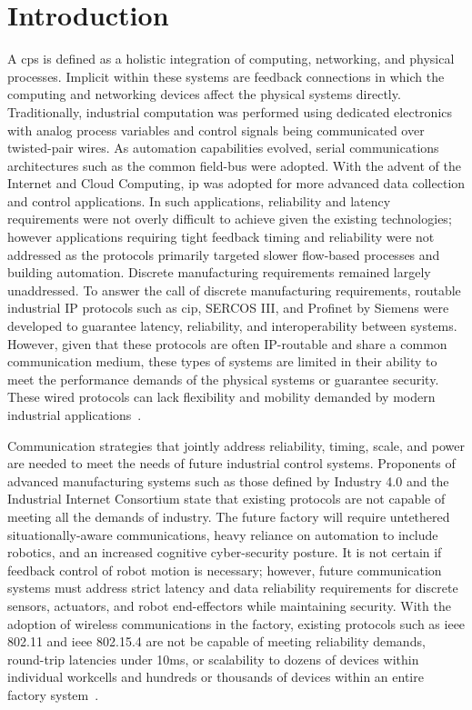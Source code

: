 \chapter{Introduction}\label{chapter:intro}

\chapterintro*

A \Gls{cps} is defined as a holistic integration of computing, networking, and physical processes.  Implicit within these systems are feedback connections in which the computing and networking devices affect the physical systems directly\cite{CPSConceptMap}.  Traditionally, industrial computation was performed using dedicated electronics with analog process variables and control signals being communicated over twisted-pair wires.  As automation capabilities evolved, serial communications architectures such as the common field-bus were adopted.  With the advent of the Internet and Cloud Computing, \gls{ip} was adopted for more advanced data collection and control applications.  In such applications, reliability and latency requirements were not overly difficult to achieve given the existing technologies; however applications requiring tight feedback timing and reliability were not addressed as the protocols primarily targeted slower flow-based processes and building automation.  Discrete manufacturing requirements remained largely unaddressed.  To answer the call of discrete manufacturing requirements, routable industrial IP protocols such as \gls{cip}, SERCOS III, and Profinet by Siemens were developed to guarantee latency, reliability, and interoperability between systems.  However, given that these protocols are often IP-routable and share a common communication medium, these types of systems are limited in their ability to meet the performance demands of the physical systems or guarantee security.   These wired protocols can lack flexibility and mobility demanded by modern industrial applications~\cite{IntroICSTutorials, KnappICSSecurity2015}.

Communication strategies that jointly address reliability, timing, scale, and power are needed to meet the needs of future industrial control systems.  Proponents of advanced manufacturing systems such as those defined by Industry 4.0 and the Industrial Internet Consortium state that existing protocols are not capable of meeting all the demands of industry.  The future factory will require untethered situationally-aware communications, heavy reliance on automation to include robotics, and an increased cognitive cyber-security posture.  It is not certain if feedback control of robot motion is necessary; however, future communication systems must address strict latency and data reliability requirements for discrete sensors, actuators, and robot end-effectors while maintaining security.  With the adoption of wireless communications in the factory, existing protocols such as \gls{ieee} 802.11 and \gls{ieee} 802.15.4 are not be capable of meeting reliability demands, round-trip latencies under 10ms, or scalability to dozens of devices within individual workcells and hundreds or thousands of devices within an entire factory system~\cite{Holfeld2016, Montgomery2019}.    

